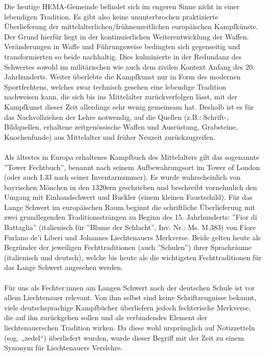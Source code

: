 Die heutige HEMA-Gemeinde befindet sich im engeren Sinne nicht in einer lebendigen Tradition.
Es gibt also keine ununterbrochen praktizierte Überlieferung der mittelalterlichen/frühneuzeitlichen europäischen Kampfkünste.
Der Grund hierfür liegt in der kontinuierlichen Weiterentwicklung der Waffen.
Veränderungen in Waffe und Führungsweise bedingten sich gegenseitig und transformierten so beide nachhaltig.
Dies kulminierte in der Redundanz des Schwertes sowohl im militärischen wie auch dem zivilen Kontext Anfang des 20. Jahrhunderts.
Weiter überlebte die Kampfkunst nur in Form des modernen Sportfechtens, welches zwar technisch gesehen eine lebendige Tradition nachweisen kann, die sich bis ins Mittelalter zurückverfolgen lässt, mit der Kampfkunst dieser Zeit allerdings sehr wenig gemeinsam hat.
Deshalb ist es für das Nachvollziehen der Lehre notwendig, auf die Quellen (z.B.: Schrift-, Bildquellen, erhaltene zeitgenössische Waffen und Ausrüstung, Grabsteine, Knochenfunde) aus Mittelalter und früher Neuzeit zurückzugreifen.
\\
\\
Als ältestes in Europa erhaltenes Kampfbuch des Mittelalters gilt das sogenannte ''Tower Fechtbuch'', benannt nach seinem Aufbewahrungsort im Tower of London (oder auch I.33 nach seiner Inventarnummer).
Es wurde wahrscheinlich von bayrischen Mönchen in den 1320ern geschrieben und beschreibt vornehmlich den Umgang mit Einhandschwert und Buckler (einem kleinen Faustschild).
Für das Lange Schwert im europäischen Raum beginnt die schriftliche Überlieferung mit zwei grundlegenden Traditionssträngen zu Beginn des 15. Jahrhunderts: ''Fior di Battaglia'' (italienisch für ''Blume der Schlacht'', Inv. Nr.: Ms. M.383) von Fiore Furlano de'i Liberi und Johannes Liechtenauers Merkverse.
Beide gelten heute als Begründer der jeweiligen Fechttraditionen (auch ''Schulen'') ihrer Sprachräume (italienisch und deutsch), welche bis heute als die wichtigsten Fechttraditionen für das Lange Schwert angesehen werden.
\\
\\
Für uns als Fechter:innen am Langen Schwert nach der deutschen Schule ist vor allem Liechtenauer relevant.
Von ihm selbst sind keine Schriftzeugnisse bekannt, viele deutschsprachige Kampfbücher überliefern jedoch fechterische Merkverse, die auf ihn zurückgehen sollen und als verbindendes Element der liechtenauerschen Tradition wirken.
Da diese wohl ursprünglich auf Notizzetteln (sog. „zedel“) überliefert wurden, wurde dieser Begriff mit der Zeit zu einem Synonym für Liechtenauers Verslehre.
